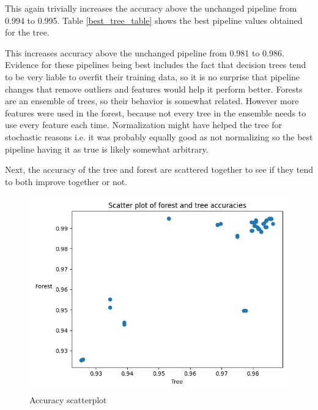\documentclass[12pt, letterpaper]{article}
\begin{document}
This again trivially increases the accuracy above the unchanged pipeline from 0.994 to 0.995. Table \ref{best_tree_table} shows the best pipeline values obtained for the tree.

\begin{table}[H]
\centering
\caption{Best pipeline values for the tree}
\label{best_tree_table}
\end{table}

This increases accuracy above the unchanged pipeline from 0.981 to 0.986. Evidence for these pipelines being best includes the fact that decision trees tend to be very liable to overfit their training data, so it is no surprise that pipeline changes that remove outliers and features would help it perform better. Forests are an ensemble of trees, so their behavior is somewhat related. However more features were used in the forest, because not every tree in the ensemble needs to use every feature each time. Normalization might have helped the tree for stochastic reasons i.e. it was probably equally good as not normalizing so the best pipeline having it as true is likely somewhat arbitrary.

Next, the accuracy of the tree and forest are scattered together to see if they tend to both improve together or not.

\begin{figure}[H]
    \centering
    \includegraphics[scale=0.7]{accuracy_scatterplot.png}
    \caption{Accuracy scatterplot}
    \label{acc_plt} %
\end{figure}
\end{document}
